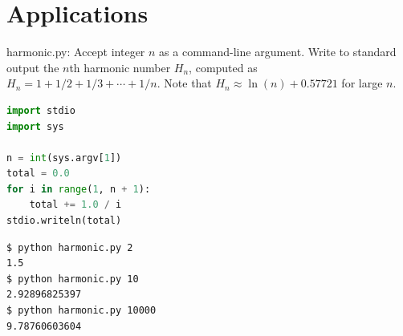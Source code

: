 \documentclass[8pt,a4paper,compress]{beamer}
\begin{document}
\section{Applications}
\begin{frame}[fragile]
\pause

\begin{framed}
\tiny harmonic.py: Accept integer $n$ as a command-line argument. Write to standard output the $n$th harmonic number $H_n$, computed as $H_n=1+1/2+1/3+\cdots+1/n$. Note that $H_n \approx \ln(n) + 0.57721$ for large $n$.
\end{framed}

\begin{lstlisting}[language=Python]
import stdio
import sys

n = int(sys.argv[1])
total = 0.0
for i in range(1, n + 1):
    total += 1.0 / i
stdio.writeln(total)
\end{lstlisting}

\pause

\begin{lstlisting}[language={}]
$ python harmonic.py 2
1.5
$ python harmonic.py 10
2.92896825397
$ python harmonic.py 10000
9.78760603604
\end{lstlisting}
\end{frame}
\end{document}
